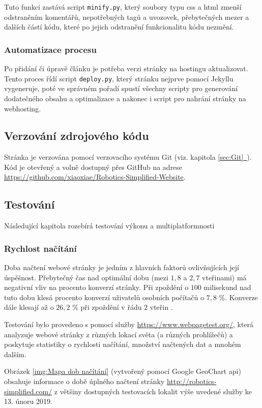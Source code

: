 \documentclass[a4paper, 12pt]{article}
\newcommand*{\fullref}[1]{\hyperref[{#1}]{\ref*{#1}~\nameref*{#1}}}
\begin{document}
  Tuto funkci zastává script \texttt{minify.py}, který soubory typu \gls{css} a \gls{html} zmenší odstraněním komentářů, nepotřebných tagů a uvozovek, přebytečných mezer a dalších částí kódu, které po jejich odstranění funkcionalitu kódu nezmění.


  \subsubsection{Automatizace procesu}
  Po přidání či úpravě článku je potřeba verzi stránky na hostingu aktualizovat. Tento proces řídí script \texttt{deploy.py}, který stránku nejprve pomocí Jekyllu vygeneruje, poté ve správném pořadí spustí všechny scripty pro generování dodatečného obsahu a optimalizace a nakonec i script pro nahrání stránky na webhosting.


  \subsection{Verzování zdrojového kódu}
  Stránka je verzována pomocí verzovacího systému Git (viz. kapitola \fullref{sec:Git}). Kód je otevřený a volně dostupný přes GitHub na adrese \url{https://github.com/xiaoxiae/Robotics-Simplified-Website}.


  \subsection{Testování}
  Následující kapitola rozebírá testování výkonu a multiplatformnosti

  \subsubsection{Rychlost načítání}
  Doba načtení webové stránky je jedním z hlavních faktorů ovlivňujících její úspěšnost. Přebytečný čas nad optimální dobu (mezi $1,8$ a $2,7$ vteřinami) má negativní vliv na procento konverzí stránky. Při zpoždění o $100$ milisekund nad tuto dobu klesá procento konverzí uživatelů osobních počítačů o $7,8$ \%. Konverze dále klesají až o $26,2$ \% při zpoždění v řádu $2$ vteřin \cite{conversion-rate-statistics}.

  Testování bylo provedeno s pomocí služby \url{https://www.webpagetest.org/}, která analyzuje webové stránky z různých lokací světa (a různých prohlížečů) a poskytuje statistiky o rychlosti načítání, množství načtených dat a mnohém dalším.

  Obrázek \ref{img:Mapa dob načítání} (vytvořený pomocí Google GeoChart \gls{api}) obsahuje informace o době úplného načtení stránky \url{http://robotics-simplified.com/} z většiny dostupných testovacích lokalit výše uvedené služby ke 13. únoru 2019.
\end{document}
